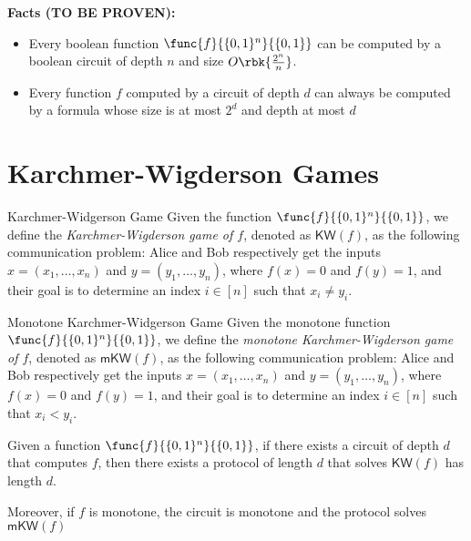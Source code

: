 \documentclass[a4paper, 12pt]{report}
\begin{document}
    \textbf{Facts (TO BE PROVEN):}

    \begin{itemize}
        \item Every boolean function $\func{f}{\{0,1\}^n}{\{0,1\}}$ can be computed by a boolean circuit of depth $n$ and size $O \rbk{\frac{2^n}{n}}$.

        \item Every function $f$ computed by a circuit of depth $d$ can always be computed by a formula whose size is at most $2^d$ and depth at most $d$
    \end{itemize}


    \section{Karchmer-Wigderson Games}

    \begin{frameddefn}{Karchmer-Widgerson Game}
        Given the function $\func{f}{\{0,1\}^n}{\{0,1\}}$, we define the \textit{Karchmer-Wigderson game of $f$}, denoted as $\mathsf{KW}(f)$, as the following communication problem: Alice and Bob respectively get the inputs $x = (x_1, \ldots, x_n)$ and $y = (y_1, \ldots, y_n)$, where $f(x) = 0$ and $f(y) = 1$, and their goal is to determine an index $i \in [n]$ such that $x_i \neq y_i$.
    \end{frameddefn}

    \begin{frameddefn}{Monotone Karchmer-Widgerson Game}
        Given the monotone function $\func{f}{\{0,1\}^n}{\{0,1\}}$, we define the \textit{monotone Karchmer-Wigderson game of $f$}, denoted as $\mathsf{mKW}(f)$, as the following communication problem: Alice and Bob respectively get the inputs $x = (x_1, \ldots, x_n)$ and $y = (y_1, \ldots, y_n)$, where $f(x) = 0$ and $f(y) = 1$, and their goal is to determine an index $i \in [n]$ such that $x_i < y_i$.
    \end{frameddefn}
    
    \begin{framedlem}{}
        Given a function $\func{f}{\{0,1\}^n}{\{0,1\}}$, if there exists a circuit of depth $d$ that computes $f$, then there exists a protocol of length $d$ that solves $\mathsf{KW}(f)$ has length $d$.

        Moreover, if $f$ is monotone, the circuit is monotone and the protocol solves $\mathsf{mKW}(f)$
    \end{framedlem}
\end{document}
